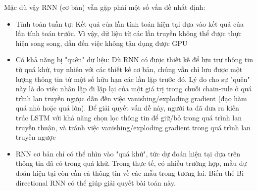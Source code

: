 Mặc dù vậy RNN (cơ bản) vẫn gặp phải một số vấn đề nhất định:
\begin{itemize}
    \item Tính toán tuần tự: Kết quả của lần tính toán hiện tại dựa vào kết quả của lần tính toán trước. Vì vậy, dữ liệu từ các lần truyền không thể được thực hiện song song, dẫn đến việc không tận dụng được GPU
    \item Có khả năng bị "quên" dữ liệu: Dù RNN có được thiết kế để lưu trữ thông tin từ quá khứ, tuy nhiên với các thiết kế cơ bản, chúng vẫn chỉ lưu được một lượng thông tin từ một số hữu hạn các lần lặp trước đó. Lý do cho sự "quên" này là do việc nhân lặp đi lặp lại của một giá trị trong chuỗi chain-rule ở quá trình lan truyền ngược dẫn đến việc vanishing/exploding gradient (đạo hàm quá nhỏ hoặc quá lớn). Để giải quyết vấn đề này, người ta đã đưa ra kiến trúc LSTM với khả năng chọn lọc thông tin để giữ/bỏ trong quá trình lan truyền thuận, và tránh việc vanishing/exploding gradient trong quá trình lan truyền ngược
    \item RNN cơ bản chỉ có thể nhìn vào "quá khứ", tức dự đoán hiện tại dựa trên thông tin đã có trong quá khứ. Trong thực tế, có nhiều trường hợp, mẫu dự đoán hiện tại còn cần cả thông tin về các mẫu trong tương lai. Biến thể Bi-directional RNN có thể giúp giải quyết bài toán này.
\end{itemize}
